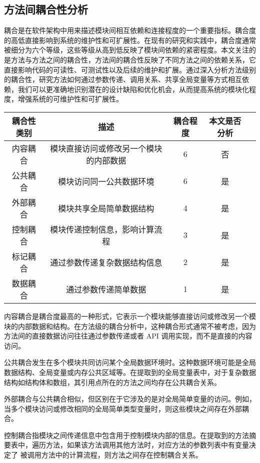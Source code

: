 \subsection{方法间耦合性分析}

耦合是在软件架构中用来描述模块间相互依赖和连接程度的一个重要指标。耦合度的高低直接影响到系统的维护性和可扩展性。在现有的研究和实践中，耦合度通常被细分为六个等级，这些等级从高到低反映了模块间依赖的紧密程度。本文关注的是方法与方法之间的耦合性，方法间的耦合性反映了不同方法之间的依赖关系，它直接影响代码的可读性、可测试性以及后续的维护和扩展。通过深入分析方法级别的耦合性，研究方法如何通过参数传递、调用关系、共享全局变量等方式相互依赖，我们可以更准确地识别潜在的设计缺陷和优化机会，从而提高系统的模块化程度，增强系统的可维护性和可扩展性。

\begin{table}[htbp]
\vspace{0.5em}\centering\wuhao
\begin{tabular}{ccccc}
\toprule
耦合性类别 & 描述 & 耦合程度 & 本文是否分析 \\
\midrule
内容耦合 & 模块直接访问或修改另一个模块的内部数据 & 6 & 否\\
公共耦合 & 模块访问同一公共数据环境 & 6 & 是 \\
外部耦合 & 模块共享全局简单数据结构 & 4 & 是 \\
控制耦合 & 模块传递控制信息，影响计算流程 & 3 & 是 \\
标记耦合 & 通过参数传递复杂数据结构信息 & 2 & 是 \\
数据耦合 & 通过参数传递简单数据 & 1 & 是 \\
\bottomrule
\end{tabular}
\end{table}


内容耦合是耦合度最高的一种形式，它表示一个模块能够直接访问或修改另一个模块的内部数据和结构。在方法级的耦合分析中，这种耦合形式通常不被考虑，因为方法间的直接数据访问往往通过参数传递或者 API 调用实现，而不是直接的内容访问。

公共耦合发生在多个模块共同访问某个全局数据环境时。这种数据环境可能是全局数据结构、全局变量或内存公共区域等。在提取到的全局变量表中，对于复杂数据结构如结构体和数组，其引用点所在的方法之间均存在公共耦合关系。


外部耦合与公共耦合相似，但区别在于它涉及的是对全局简单变量的访问。例如，当多个模块访问或修改相同的全局简单类型变量时，则这些模块之间存在外部耦合。


控制耦合指模块之间传递信息中包含用于控制模块内部的信息。在提取到的方法摘
要表中，遍历方法，如果该方法调用其他方法时，对应方法的参数列表中有变量决定了
被调用方法中的计算流程，则方法之间存在控制耦合关系。


